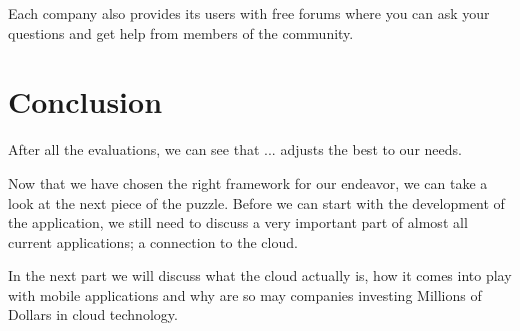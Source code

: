 Each company also provides its users with free forums where you can ask your questions and get help from members of the community. 





\section{Conclusion}

After all the evaluations, we can see that ... adjusts the best to our needs. 




Now that we have chosen the right framework for our endeavor, we can take a look at the next piece of the puzzle. Before we can start with the development of the application, we still need to discuss a very important part of almost all current applications; a connection to the cloud. 

In the next part we will discuss what the cloud actually is, how it comes into play with mobile applications and why are so may companies investing Millions of Dollars in cloud technology. 